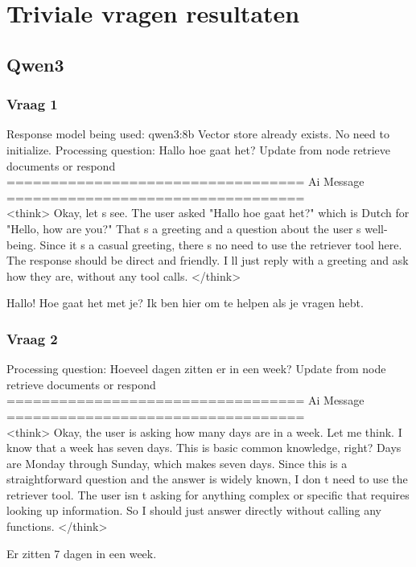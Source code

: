 \section{Triviale vragen resultaten}
\label{triviale-vragen-resultaten}


\subsection{Qwen3}
\subsubsection{Vraag 1}
Response model being used: qwen3:8b
Vector store already exists. No need to initialize.
Processing question: Hallo hoe gaat het?
Update from node retrieve documents or respond
\\[1em]
================================== Ai Message ==================================
\\[1em]
<think>
Okay, let s see. The user asked "Hallo hoe gaat het?" which is Dutch for "Hello, how are you?" That s a greeting and a question about the user s well-being. Since it s a casual greeting, there s no need to use the retriever tool here. The response should be direct and friendly. I ll just reply with a greeting and ask how they are, without any tool calls.
</think>

Hallo! Hoe gaat het met je? Ik ben hier om te helpen als je vragen hebt.
\subsubsection{Vraag 2}
Processing question: Hoeveel dagen zitten er in een week?
Update from node retrieve documents or respond
\\[1em]
================================== Ai Message ==================================
\\[1em]
<think>
Okay, the user is asking how many days are in a week. Let me think. I know that a week has seven days. This is basic common knowledge, right? Days are Monday through Sunday, which makes seven days. Since this is a straightforward question and the answer is widely known, I don t need to use the retriever tool. The user isn t asking for anything complex or specific that requires looking up information. So I should just answer directly without calling any functions.
</think>

Er zitten 7 dagen in een week.
